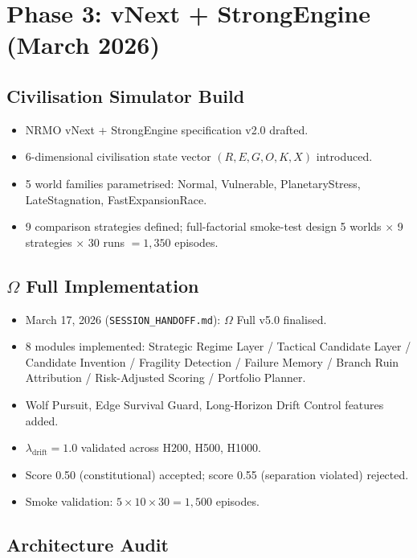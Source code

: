 \section{Phase 3: vNext + StrongEngine (March 2026)}
\label{sec:session-log-phase-3}

\subsection*{Civilisation Simulator Build}

\begin{itemize}
\item NRMO vNext + StrongEngine specification v2.0 drafted.
\item 6-dimensional civilisation state vector $(R, E, G, O, K, X)$
introduced.
\item 5 world families parametrised: Normal, Vulnerable,
PlanetaryStress, LateStagnation, FastExpansionRace.
\item 9 comparison strategies defined; full-factorial smoke-test
design 5 worlds $\times$ 9 strategies $\times$ 30 runs $= 1{,}350$
episodes.
\end{itemize}

\subsection*{$\Omega$ Full Implementation}

\begin{itemize}
\item March 17, 2026 (\texttt{SESSION\_HANDOFF.md}):
$\Omega$ Full v5.0 finalised.
\item 8 modules implemented: Strategic Regime Layer / Tactical
Candidate Layer / Candidate Invention / Fragility Detection /
Failure Memory / Branch Ruin Attribution / Risk-Adjusted Scoring /
Portfolio Planner.
\item Wolf Pursuit, Edge Survival Guard, Long-Horizon Drift Control
features added.
\item $\lambda_{\mathrm{drift}} = 1.0$ validated across H200, H500,
H1000.
\item Score 0.50 (constitutional) accepted; score 0.55 (separation
violated) rejected.
\item Smoke validation: $5 \times 10 \times 30 = 1{,}500$
episodes.
\end{itemize}

\subsection*{Architecture Audit}

